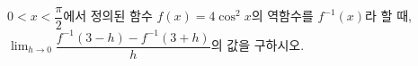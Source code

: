 $0<x<\dfrac{\pi}{2}$에서 정의된 함수 $f(x)=4\cos^2 x$의 역함수를 $f^{-1}(x)$라 할 때, $\displaystyle\lim_{h\to 0}\dfrac{f^{-1}(3-h)-f^{-1}(3+h)}{h}$의 값을 구하시오.
